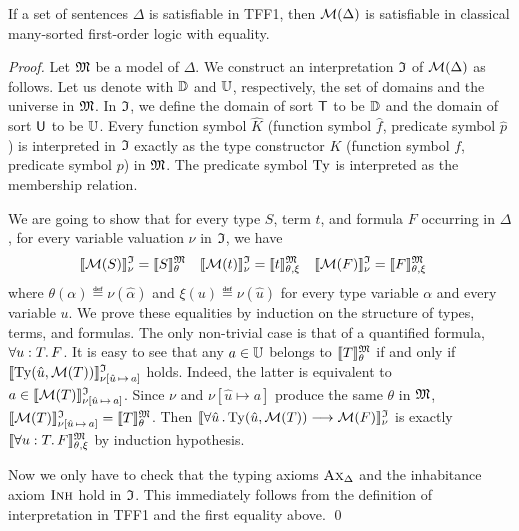 \begin{theorem} \label{thm:mon_sound}
If a set of sentences $\Delta$ is satisfiable in TFF1,
then $\mathcal{M}(\Delta)$ is satisfiable in classical
many-sorted first-order logic with equality.
\end{theorem}
\begin{proof}
Let $\mathfrak{M}$ be a model of $\Delta$.
We construct an interpretation $\mathfrak{I}$ of $\mathcal{M}(\Delta)$ as follows.
Let us denote with $\mathbb{D}$ and $\mathbb{U}$, respectively,
the set of domains and the universe in $\mathfrak{M}$.
In $\mathfrak{I}$, we define the domain of sort $\mathsf{T}$ to be $\mathbb{D}$
and the domain of sort $\mathsf{U}$ to be $\mathbb{U}$.
Every function symbol $\hat{K}$ (function symbol $\hat{f}$,
predicate symbol $\hat{p}$) is interpreted in $\mathfrak{I}$
exactly as the type constructor $K$ (function symbol $f$,
predicate symbol $p$) in $\mathfrak{M}$.
The predicate symbol $\mathrm{Ty}$ is interpreted as the membership relation.

We are going to show that for every type $S$, term $t$,
and formula $F$ occurring in $\Delta$,
for every variable valuation $\nu$ in $\mathfrak{I}$, we have
\begin{align*}
\llbracket \mathcal{M}(S) \rrbracket^{\mathfrak{I}}_{\nu} &= \llbracket S \rrbracket^{\mathfrak{M}}_{\theta} &
\llbracket \mathcal{M}(t) \rrbracket^{\mathfrak{I}}_{\nu} &= \llbracket t \rrbracket^{\mathfrak{M}}_{\theta,\xi} &
\llbracket \mathcal{M}(F) \rrbracket^{\mathfrak{I}}_{\nu} &= \llbracket F \rrbracket^{\mathfrak{M}}_{\theta,\xi}
\end{align*}
where $\theta(\alpha) \eqdef \nu(\hat{\alpha})$ and
$\xi(u) \eqdef \nu(\hat{u})$ for every
type variable $\alpha$ and every variable $u$.
%
We prove these equalities by induction on the structure
of types, terms, and formulas. The only non-trivial case is
that of a quantified formula, $\forall u \mathrel{:} T .\, F$.
It is easy to see that any $a \in \mathbb{U}$ belongs
to $\llbracket T \rrbracket^{\mathfrak{M}}_\theta$ if and only if
$\llbracket \mathrm{Ty}(\hat{u},\mathcal{M}(T)) \rrbracket^{\mathfrak{I}}_{\nu[\hat{u}\,\mapsto\,a]}$
holds. Indeed, the latter is equivalent to
$a \in \llbracket \mathcal{M}(T) \rrbracket^{\mathfrak{I}}_{\nu[\hat{u}\,\mapsto\,a]}$.
Since $\nu$ and $\nu[\hat{u} \mapsto a]$ produce the same
$\theta$ in $\mathfrak{M}$,
$\llbracket \mathcal{M}(T) \rrbracket^{\mathfrak{I}}_{\nu[\hat{u}\,\mapsto\,a]} =
\llbracket T \rrbracket^{\mathfrak{M}}_\theta$.
Then
$\llbracket \forall \hat{u} \,.\, \mathrm{Ty}(\hat{u},\mathcal{M}(T))
\longrightarrow \mathcal{M}(F) \rrbracket^{\mathfrak{I}}_{\nu}$ is exactly
$\llbracket \forall u \mathrel{:} T .\, F \rrbracket^{\mathfrak{M}}_{\theta,\xi}$
by induction hypothesis.

Now we only have to check that the typing axioms
$\text{\sc Ax}_{\Delta}$ and the inhabitance axiom $\text{\sc Inh}$ hold in $\mathfrak{I}$.
This immediately follows from the definition of
interpretation in TFF1 and the first equality above.
\qed
\end{proof}

